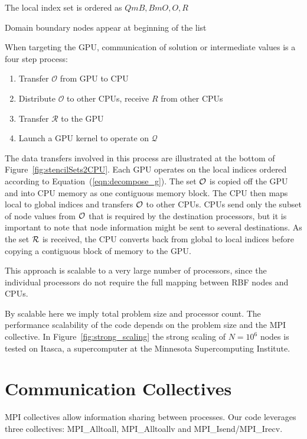 \documentclass{report}
\begin{document}
\authnote{} The local index set is ordered as ${QmB, BmO, O, R}$ 

\authnote{} Domain boundary nodes appear at beginning of the list 


When targeting the GPU, communication of solution or intermediate values is a four step process:
        \begin{enumerate}
    \item Transfer $\mathcal{O}$ from GPU to CPU
	\item Distribute $\mathcal{O}$ to other CPUs, receive $R$ from other CPUs
	\item Transfer $\mathcal{R}$ to the GPU
	\item Launch a GPU kernel to operate on $\mathcal{Q}$
     \end{enumerate} 
The data transfers involved in this process are illustrated at the bottom of Figure~\ref{fig:stencilSets2CPU}.
    Each GPU operates on the local indices ordered 
according to Equation~(\ref{eqn:decompose_g}). The set 
$\mathcal{O}$ is copied off the GPU and into CPU memory as one contiguous memory block. The CPU then maps local to global indices and transfers $\mathcal{O}$ to other CPUs. CPUs send only the subset of node values from $\mathcal{O}$ that is required by the destination processors, but it is important to note that node information might be sent to several destinations. 
As the set $\mathcal{R}$ is received, the CPU converts back from global to local indices before copying a contiguous block of memory to the GPU. 

        This approach is scalable to a very large number of 
		processors, since the individual processors do not require the 
		full mapping between RBF nodes and CPUs. 
		
		By scalable here we imply total problem size and processor count. The performance scalability of the code depends on the problem size and the MPI collective. In Figure~\ref{fig:strong_scaling} the strong scaling of $N=10^6$ nodes is tested on Itasca, a supercomputer at the Minnesota Supercomputing Institute.   

\section{Communication Collectives} 

MPI collectives allow information sharing between processes. Our code leverages three collectives: MPI\_Alltoall, MPI\_Alltoallv and MPI\_Isend/MPI\_Irecv. 
\end{document}

